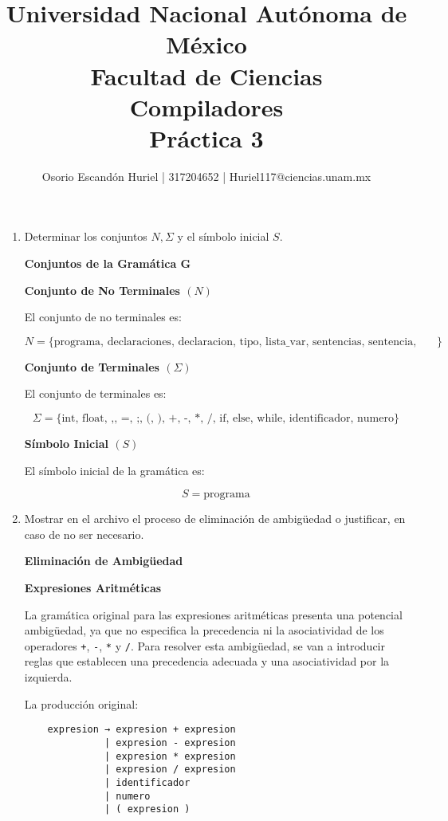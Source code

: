 \documentclass{article}
\title{ Universidad Nacional Autónoma de México \\ Facultad de Ciencias \\ Compiladores \\ Práctica 3}
\author{ Osorio Escandón Huriel | 317204652 | Huriel117@ciencias.unam.mx }
\date{}
\begin{document}
\maketitle

\begin{enumerate}
    \item Determinar los conjuntos $ N, \Sigma $ y el símbolo inicial $ S $.

    \textbf{Conjuntos de la Gramática G}

    \textbf{Conjunto de No Terminales $(N)$}

    El conjunto de no terminales es:

    \[
    N = \{ \text{programa, declaraciones, declaracion, tipo, lista\_var, sentencias, sentencia, expresion} \}
    \]

    \textbf{Conjunto de Terminales $(\Sigma)$}

    El conjunto de terminales es:

    \[
    \Sigma = \{ \text{int, float, ,, =, ;, (, ), +, -, *, /, if, else, while, identificador, numero} \}
    \]

    \textbf{Símbolo Inicial $(S)$}

    El símbolo inicial de la gramática es:

    \[
    S = \text{programa}
    \]

    \item Mostrar en el archivo el proceso de eliminación de ambigüedad o justificar, en caso de no ser necesario.

    \textbf{Eliminación de Ambigüedad}

    \textbf{Expresiones Aritméticas}

    La gramática original para las expresiones aritméticas presenta una potencial ambigüedad, ya que no especifica la precedencia ni la asociatividad de los operadores \texttt{+}, \texttt{-}, \texttt{*} y \texttt{/}. Para resolver esta ambigüedad, se van a introducir reglas que establecen una precedencia adecuada y una asociatividad por la izquierda.

    La producción original:

        \begin{verbatim}
    expresion → expresion + expresion
              | expresion - expresion
              | expresion * expresion
              | expresion / expresion
              | identificador
              | numero
              | ( expresion )
    \end{verbatim}


\end{enumerate}
\end{document}
